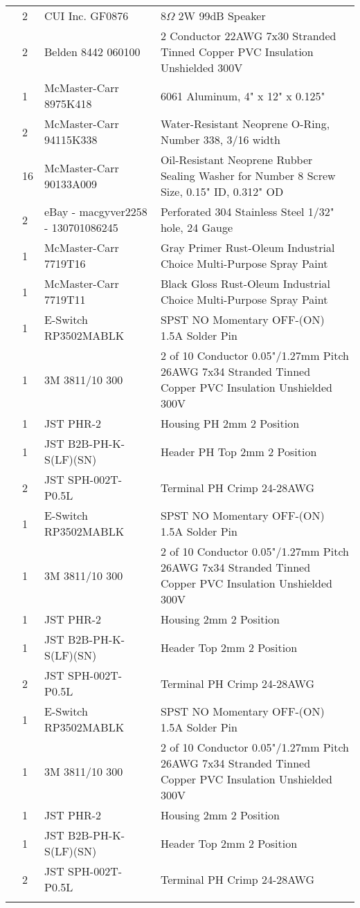 \begin{longtabu}{X[3,c,m] X[1,c,m] X[3,c,m] X[5,l,m]}
   & 2 & CUI Inc. GF0876 & 8$\Omega$ 2W 99dB Speaker \\
  & 2 & Belden 8442 060100 & 2 Conductor 22AWG 7x30 Stranded Tinned Copper PVC Insulation Unshielded 300V \\
  & 1 & McMaster-Carr 8975K418 & 6061 Aluminum, 4" x 12" x 0.125" \\
  & 2 & McMaster-Carr 94115K338 & Water-Resistant Neoprene O-Ring, Number 338, 3/16 width \\
  & 16 & McMaster-Carr 90133A009 & Oil-Resistant Neoprene Rubber Sealing Washer for Number 8 Screw Size, 0.15" ID, 0.312" OD \\
  & 2 & eBay - macgyver2258 - 130701086245 & Perforated 304 Stainless Steel 1/32" hole, 24 Gauge \\
  & 1 & McMaster-Carr 7719T16 & Gray Primer Rust-Oleum Industrial Choice Multi-Purpose Spray Paint \\
  & 1 & McMaster-Carr 7719T11 & Black Gloss Rust-Oleum Industrial Choice Multi-Purpose Spray Paint \\ \mrule

   & 1 & E-Switch RP3502MABLK & SPST NO Momentary OFF-(ON) 1.5A Solder Pin \\
  & 1 & 3M 3811/10 300 & 2 of 10 Conductor 0.05"/1.27mm Pitch 26AWG 7x34 Stranded Tinned Copper PVC Insulation Unshielded 300V \\
  & 1 & JST PHR-2 & Housing PH 2mm 2 Position \\
  & 1 & JST B2B-PH-K-S(LF)(SN) & Header PH Top 2mm 2 Position \\
  & 2 & JST SPH-002T-P0.5L & Terminal PH Crimp 24-28AWG \\ \mrule

   & 1 & E-Switch RP3502MABLK & SPST NO Momentary OFF-(ON) 1.5A Solder Pin \\
  & 1 & 3M 3811/10 300 & 2 of 10 Conductor 0.05"/1.27mm Pitch 26AWG 7x34 Stranded Tinned Copper PVC Insulation Unshielded 300V \\
  & 1 & JST PHR-2 & Housing 2mm 2 Position \\
  & 1 & JST B2B-PH-K-S(LF)(SN) & Header Top 2mm 2 Position \\
  & 2 & JST SPH-002T-P0.5L & Terminal PH Crimp 24-28AWG \\ \mrule

   & 1 & E-Switch RP3502MABLK & SPST NO Momentary OFF-(ON) 1.5A Solder Pin \\
  & 1 & 3M 3811/10 300 & 2 of 10 Conductor 0.05"/1.27mm Pitch 26AWG 7x34 Stranded Tinned Copper PVC Insulation Unshielded 300V \\
  & 1 & JST PHR-2 & Housing 2mm 2 Position \\
  & 1 & JST B2B-PH-K-S(LF)(SN) & Header Top 2mm 2 Position \\
  & 2 & JST SPH-002T-P0.5L & Terminal PH Crimp 24-28AWG \\ \mrule


\end{longtabu}
